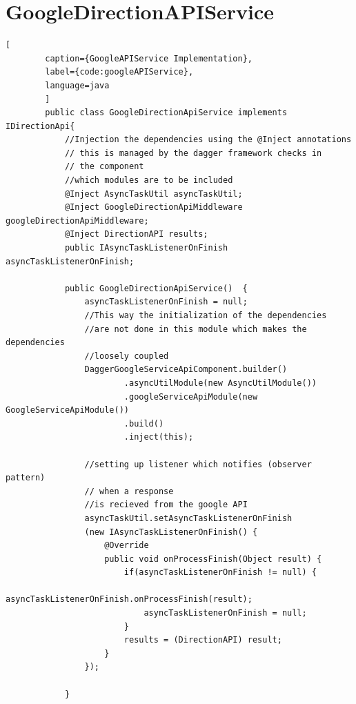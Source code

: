 \newpage
\section{GoogleDirectionAPIService}
    \begin{lstlisting}[
        caption={GoogleAPIService Implementation},
        label={code:googleAPIService},
        language=java
        ]
        public class GoogleDirectionApiService implements IDirectionApi{
            //Injection the dependencies using the @Inject annotations
            // this is managed by the dagger framework checks in
            // the component 
            //which modules are to be included
            @Inject AsyncTaskUtil asyncTaskUtil;
            @Inject GoogleDirectionApiMiddleware googleDirectionApiMiddleware;
            @Inject DirectionAPI results;
            public IAsyncTaskListenerOnFinish asyncTaskListenerOnFinish;

            public GoogleDirectionApiService()  {
                asyncTaskListenerOnFinish = null;
                //This way the initialization of the dependencies 
                //are not done in this module which makes the dependencies 
                //loosely coupled
                DaggerGoogleServiceApiComponent.builder()
                        .asyncUtilModule(new AsyncUtilModule())
                        .googleServiceApiModule(new GoogleServiceApiModule())
                        .build()
                        .inject(this);

                //setting up listener which notifies (observer pattern)
                // when a response 
                //is recieved from the google API
                asyncTaskUtil.setAsyncTaskListenerOnFinish
                (new IAsyncTaskListenerOnFinish() {
                    @Override
                    public void onProcessFinish(Object result) {
                        if(asyncTaskListenerOnFinish != null) {
                            asyncTaskListenerOnFinish.onProcessFinish(result);
                            asyncTaskListenerOnFinish = null;
                        }
                        results = (DirectionAPI) result;
                    }
                });

            }


\end{lstlisting}
